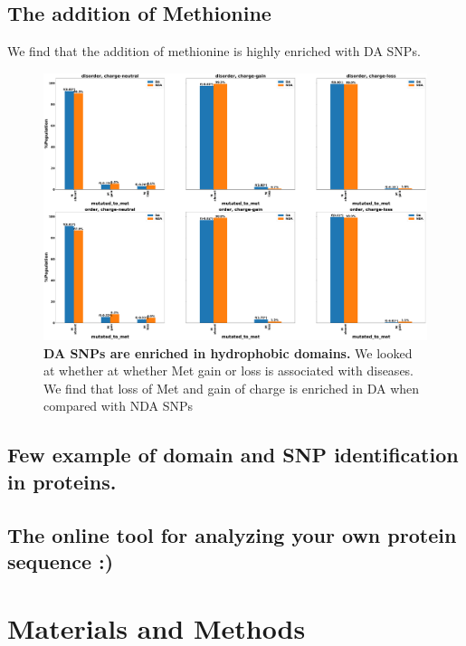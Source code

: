 \documentclass[10pt,letterpaper]{article}
\begin{document}
\subsection*{The addition of Methionine}
We find that the addition of methionine is highly enriched with DA SNPs. 
\begin{figure}[!ht]
\includegraphics[scale=0.1,width=\textwidth,trim={0 0cm 0 0cm},clip]{./figures/charge_vs_no_charge_order_vs_disorder_SNP_mutated_to_met.pdf}
\caption{{\bf DA SNPs are enriched in hydrophobic domains.} We looked at whether at whether Met gain or loss is associated with diseases. We find that loss of Met and gain of charge is enriched in DA when compared with NDA SNPs}
\label{fig5} 
\end{figure}
\bigbreak
\subsection*{Few example of domain and SNP identification in proteins.}
\bigbreak
\subsection*{The online tool for analyzing your own protein sequence :)}
\bigbreak
\section*{Materials and Methods}
\end{document}

